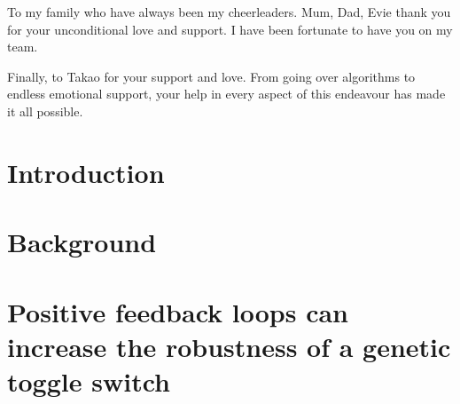 \documentclass[]{phdthesis}
\begin{document}
\begin{acknowledgements}
To my family who have always been my cheerleaders. Mum, Dad, Evie thank you for your unconditional love and support. I have been fortunate to have you on my team. 

Finally, to Takao for your support and love. From going over algorithms to endless emotional support, your help in every aspect of this endeavour has made it all possible. 

\end{acknowledgements}
\tableofcontents*
\listoffigures
\listoftables
{}

\printglossary[type=\acronymtype, title=Abbreviations, toctitle=List of Abbreviations]





\mainmatter*
\chapter{Introduction}
\label{ch:Intro}


\mainmatter*
\chapter{Background}
\label{ch:backg}



%

\mainmatter*
\chapter{Positive feedback loops can increase the robustness of a genetic toggle switch}
\label{ch:abcsysbio}

\end{document}
